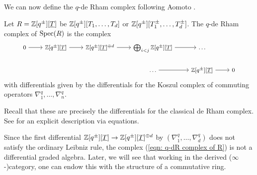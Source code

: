 We can now define the $q$-de Rham complex following Aomoto \cite{Aomoto}. 
\begin{definition}\label{def: q-dR complex}
    Let $R=\mathbb{Z}[q^{\pm}][\underline{T}]$ be $\mathbb{Z}[q^{\pm}][T_{1},\dots,T_{d}]$ or $\mathbb{Z}[q^{\pm}][T_{1}^{\pm},\dots,T_{d}^{\pm}]$. The $q$-de Rham complex of $\operatorname{Spec}(R)$ is the complex
    \begin{equation}\label{eqn: q-dR complex of R}
        \footnotesize 
        \begin{tikzcd}
            0 & {\ZZ[q^{\pm}][\underline{T}]} & {\ZZ[q^{\pm}][\underline{T}]^{\oplus d}} & {\bigoplus_{i<j}\ZZ[q^{\pm}][\underline{T}]} & \dots \\
            &&& \dots & {\ZZ[q^{\pm}][\underline{T}]} & 0
            \arrow[from=1-1, to=1-2]
            \arrow[from=1-2, to=1-3]
            \arrow[from=1-3, to=1-4]
            \arrow[from=1-4, to=1-5]
            \arrow[from=2-4, to=2-5]
            \arrow[from=2-5, to=2-6]
        \end{tikzcd}
        \normalsize
    \end{equation}
    with differentials given by the differentials for the Koszul complex of commuting operators $\nabla_{1}^{q},\dots,\nabla_{n}^{q}$. 
\end{definition}
\begin{remark}
    Recall that these are precisely the differentials for the classical de Rham complex. See \cite[\href{https://stacks.math.columbia.edu/tag/0FKF}{Tag 0FKF}]{stacks-project} for an explicit description via equations. 
\end{remark}
\begin{remark}
    Since the first differential $\mathbb{Z}[q^{\pm}][\underline{T}]\to\mathbb{Z}[q^{\pm}][\underline{T}]^{\oplus d}$ by $(\nabla_{1}^{q},\dots,\nabla_{d}^{q})$ does not satisfy the ordinary Leibniz rule, the complex (\ref{eqn: q-dR complex of R}) is not a differential graded algebra. Later, we will see that working in the derived ($\infty$-)category, one can endow this with the structure of a commutative ring.  
\end{remark}
